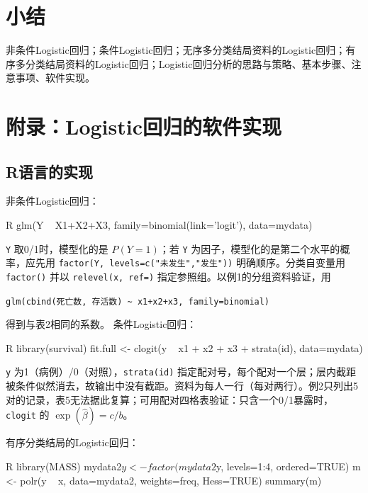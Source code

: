 \section*{小结}
非条件Logistic回归；条件Logistic回归；无序多分类结局资料的Logistic回归；有序多分类结局资料的Logistic回归；Logistic回归分析的思路与策略、基本步骤、注意事项、软件实现。
\section{附录：Logistic回归的软件实现}
\subsection{R语言的实现}
非条件Logistic回归：
\par\noindent
\begin{coursecode}{R}
glm(Y ~ X1+X2+X3, family=binomial(link='logit'), data=mydata)
\end{coursecode}
\par
\texttt{Y} 取0/1时，模型化的是 $P(Y=1)$；若 \texttt{Y} 为因子，模型化的是第二个水平的概率，应先用 \texttt{factor(Y, levels=c("未发生","发生"))} 明确顺序。分类自变量用 \texttt{factor()} 并以 \texttt{relevel(x, ref=)} 指定参照组。以例1的分组资料验证，用
\begin{center}\texttt{glm(cbind(死亡数, 存活数) \textasciitilde{} x1+x2+x3, family=binomial)}\end{center}
得到与表2相同的系数。
条件Logistic回归：
\par\noindent
\begin{coursecode}{R}
library(survival)
fit.full <- clogit(y ~ x1 + x2 + x3 + strata(id), data=mydata)
\end{coursecode}
\par
\begin{annotation}\texttt{y} 为1（病例）/0（对照），\texttt{strata(id)} 指定配对号，每个配对一个层；层内截距被条件似然消去，故输出中没有截距。资料为每人一行（每对两行）。例2只列出5对的记录，表5无法据此复算；可用配对四格表验证：只含一个0/1暴露时，\texttt{clogit} 的 $\exp(\widehat\beta)=c/b$。\end{annotation}
有序分类结局的Logistic回归：
\par\noindent
\begin{coursecode}{R}
library(MASS)
mydata2$y <- factor(mydata2$y, levels=1:4, ordered=TRUE)
m <- polr(y ~ x, data=mydata2, weights=freq, Hess=TRUE)
summary(m)
\end{coursecode}
